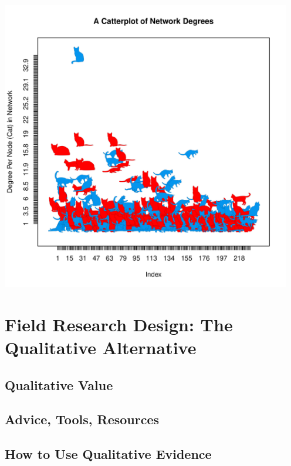 \documentclass[12pt]{article}\usepackage[]{graphicx}\usepackage[]{color}
\newenvironment{knitrout}{}{} %
\begin{document}
\begin{flushleft}
\begin{center}
\begin{knitrout}
\includegraphics[width=5in]{figure/what-1} 

\end{knitrout}
\end{center}



\clearpage
\section{Field Research Design: The Qualitative Alternative}

\subsection{Qualitative Value}

\subsection{Advice, Tools, Resources}

\subsection{How to Use Qualitative Evidence}



\clearpage

\end{flushleft}
\end{document}
